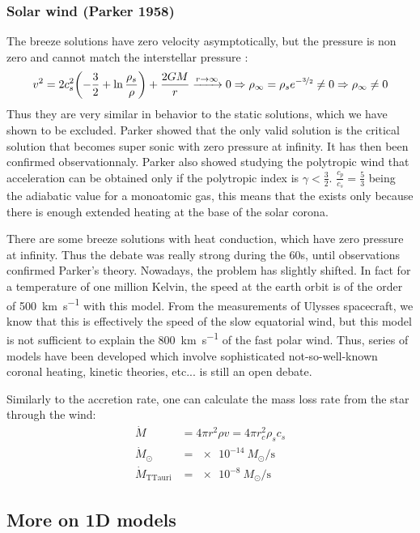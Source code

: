 \documentclass[10pt,a4paper,english]{article}
\let\originalleft\left
\let\originalright\right
\renewcommand{\left}{\mathopen{}\mathclose\bgroup\originalleft}
\renewcommand{\right}{\aftergroup\egroup\originalright}
\begin{document}
\subsubsection{Solar wind (Parker 1958)}
The breeze solutions have zero velocity asymptotically, but the
pressure is non zero and cannot match the interstellar pressure :
\begin{equation}
  v^2 = 2 c_s^2 \left( -\frac{3}{2} + \ln \frac{\rho_s}{\rho} \right) + \frac{2GM}{r} \xrightarrow{r\to\infty} 0\Rightarrow \rho_\infty = \rho_s e^{-\nicefrac{3}{2}} \neq 0 \Rightarrow \rho_\infty \neq 0
\end{equation}
Thus they are very similar in behavior to the static solutions, which
we have shown to be excluded. Parker showed that the only valid
solution is the critical solution that becomes super sonic with zero
pressure at infinity. It has then been confirmed
observationnaly. Parker also showed studying the polytropic wind that
acceleration can be obtained only if the polytropic index is
$\gamma < \frac{3}{2}$. $\frac{c_p}{c_s} = \frac{5}{3}$ being the
adiabatic value for a monoatomic gas, this means that the exists only
because there is enough extended heating at the base of the solar
corona.

There are some breeze solutions with heat conduction, which have zero
pressure at infinity. Thus the debate was really strong during the
60s, until observations confirmed Parker's theory. Nowadays, the
problem has slightly shifted. In fact for a temperature of one million
Kelvin, the speed at the earth orbit is of the order of
\SI{500}{\km\per\s} with this model. From the measurements of Ulysses
spacecraft, we know that this is effectively the speed of the slow
equatorial wind, but this model is not sufficient to explain the
\SI{800}{\km\per\s} of the fast polar wind. Thus, series of models
have been developed which involve sophisticated not-so-well-known
coronal heating, kinetic theories, etc... is still an open debate.

Similarly to the accretion rate, one can calculate the mass loss rate
from the star through the wind:
\begin{align}
  \dot{M} & = 4\pi r^2\rho v = 4\pi r^2_c\rho_sc_s \\
  \dot{M}_\odot & = \SI{e-14}{M_\odot\per\s} \\
  \dot{M}_\mathrm{TTauri} &= \SI{e-8}{M_\odot\per\s}
\end{align}

\subsection{More on 1D models}
\end{document}
